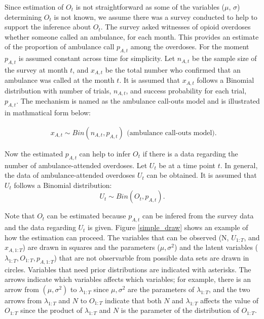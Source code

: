 \documentclass[12pt]{article}
\begin{document}
{ 
Since estimation of $O_t$ is not straightforward as some of the variables ($\mu$, $\sigma$) determining $O_t$ is not known, we assume there was a survey conducted to help to support the inference about  $O_t$. The survey asked witnesses of opioid overdoses whether someone called an ambulance, for each month. This provides an estimate of the proportion of ambulance call $p_{A,t}$ among the overdoses. For the moment $p_{A,t}$ is assumed constant across time for simplicity. Let $n_{A,t}$ be the sample size of the survey at month $t$, and $x_{A,t}$ be the total number who confirmed that an ambulance was called at the month $t$. It is assumed that $x_{A,t}$ follows a Binomial distribution with number of trials, $n_{A,t}$, and  success probability for each trial, $p_{A,t}$. The mechanism is named as the ambulance call-outs model and is illustrated in mathmatical form below:

\begin{equation}
\label{ambulance}
\left.\begin{aligned}
x_{A,t} \sim Bin(n_{A,t},p_{A,t})\end{aligned}\right.
\text{(ambulance call-outs model).}
\end{equation}

Now the estimated $p_{A,t}$ can help to infer $O_t$ if there is a data regarding the number of  ambulance-attended overdoses. Let \(U_t\) be at a time point $t$. In general, the data of ambulance-attended overdoses \(U_t\) can be obtained. It is assumed that  \(U_t\) follows a Binomial distribution: 
\begin{equation}
\label{over_amb}
\left.
U_t \sim Bin(O_t, p_{A,t}).
\right.
\end{equation}

Note that $O_t$ can be estimated because $p_{A,t}$ can be infered from the survey data and the data regarding $U_t$ is given. Figure \ref{simple_draw} shows an example of how the estimation can proceed. The variables that can be observed (N, $U_{1:T}$, and $x_{A,1:T}$) are drawn in squares and the parameters ($\mu, \sigma^2$) and the latent variables ($\lambda_{1:T}, O_{1:T}, p_{A,1:T} $) that are not observarble from possible data sets are drawn in circles. Variables that need prior distributions are indicated with asterisks. The arrows indicate which variables affects which variables; for example, there is an arrow from $(\mu, \sigma^2)$ to $\lambda_{1:T}$ since $\mu, \sigma^2$ are the parameters of $\lambda_{1:T}$, and the two arrows from  $\lambda_{1:T}$ and $N$ to $O_{1:T}$ indicate that both $N$ and $\lambda_{1:T}$ affects the value of $O_{1:T}$ since the product of $\lambda_{1:T}$ and $N$ is the parameter of the distribution of $O_{1:T}$.\\

}
\end{document}
